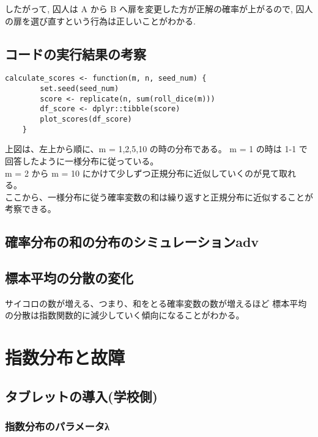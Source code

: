 \documentclass{article}
\begin{document}
したがって, 囚人は A から B へ扉を変更した方が正解の確率が上がるので, 囚人の扉を選び直すという行為は正しいことがわかる.

\subsection{コードの実行結果の考察}

\begin{lstlisting}[]
	calculate_scores <- function(m, n, seed_num) {
		set.seed(seed_num)
		score <- replicate(n, sum(roll_dice(m)))
		df_score <- dplyr::tibble(score)
		plot_scores(df_score)
	}

\end{lstlisting}


上図は、左上から順に、m = 1,2,5,10 の時の分布である。 
m = 1 の時は 1-1 で回答したように一様分布に従っている。\\
m = 2 から m = 10 にかけて少しずつ正規分布に近似していくのが見て取れる。\\
ここから、一様分布に従う確率変数の和は繰り返すと正規分布に近似することが考察できる。

\subsection{確率分布の和の分布のシミュレーションadv}

\subsection{標本平均の分散の変化}

サイコロの数が増える、つまり、和をとる確率変数の数が増えるほど
標本平均の分散は指数関数的に減少していく傾向になることがわかる。

\section{指数分布と故障}
\subsection{タブレットの導入(学校側)}
\subsubsection{指数分布のパラメータλ}
\end{document}
